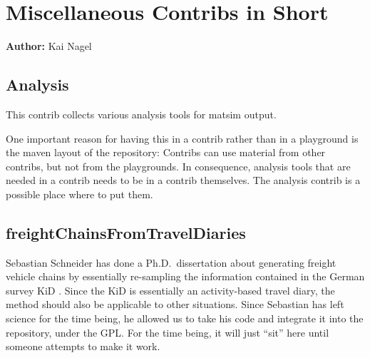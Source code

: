 \chapter{Miscellaneous Contribs in Short}
\label{ch:misccontribs}

\hfill \textbf{Author:} Kai Nagel

\section{Analysis}
\label{sec:contrib-analysis}



This contrib collects various analysis tools for \gls{matsim} output.  

One important reason for having this in a contrib rather than in a playground is the \gls{maven} layout of the repository: Contribs can use material from other contribs, but not from the playgrounds.  In consequence, analysis tools that are needed in a contrib needs to be in a contrib themselves.  The analysis contrib is a possible place where to put them.


\section{freightChainsFromTravelDiaries}
\label{sec:freightChainsFromTravelDiaries}

Sebastian Schneider has done a Ph.D.\ dissertation about generating freight vehicle chains by essentially re-sampling the information contained in the German survey KiD \citep{SteinmeyerWagner2005KiD}.  Since the KiD is essentially an activity-based travel diary, the method should also be applicable to other situations.
Since Sebastian has left science for the time being, he allowed us to take his code and integrate it into the repository, under the GPL. For the time being, it will just ``sit'' here until someone attempts to make it work.



